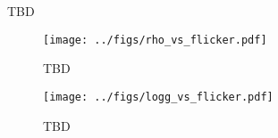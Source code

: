 
TBD

\begin{figure}
\begin{center}
\texttt{[image: ../figs/rho\_vs\_flicker.pdf]}
\caption{
TBD
} 
\label{fig:rhostar}
\end{center}
\end{figure}

\begin{figure}
\begin{center}
\texttt{[image: ../figs/logg\_vs\_flicker.pdf]}
\caption{
TBD
} 
\label{fig:logg}
\end{center}
\end{figure}
